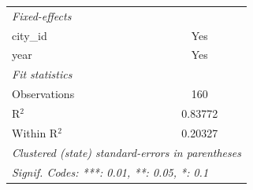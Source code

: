 \begin{tabular}{lc}
   \emph{Fixed-effects}\\
   city\_id            & Yes\\  
   year                & Yes\\  
   \midrule
   \emph{Fit statistics}\\
   Observations        & 160\\  
   R$^2$               & 0.83772\\  
   Within R$^2$        & 0.20327\\  
   \midrule \midrule
   \multicolumn{2}{l}{\emph{Clustered (state) standard-errors in parentheses}}\\
   \multicolumn{2}{l}{\emph{Signif. Codes: ***: 0.01, **: 0.05, *: 0.1}}\\
\end{tabular}
\par\endgroup


